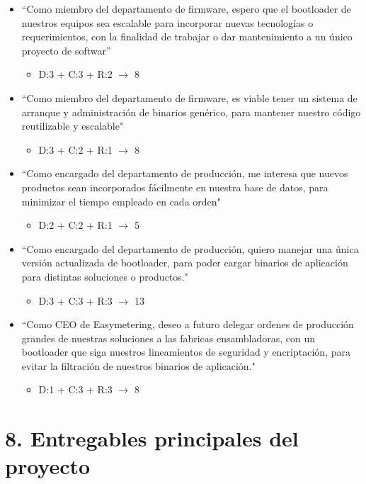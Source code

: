 \documentclass[
11pt, %
]{charter}
\begin{document}
\begin{itemize}
	\item ``Como miembro del departamento de firmware, espero que el bootloader de nuestros equipos sea escalable para incorporar nuevas tecnologías o requerimientos, con la finalidad de trabajar o dar mantenimiento a un único proyecto de softwar''
	\begin{itemize}
		\item D:3 + C:3 + R:2 $\rightarrow$ 8
	\end{itemize}
	\item ``Como miembro del departamento de firmware, es viable tener un sistema de arranque y administración de binarios genérico, para mantener nuestro código reutilizable y escalable"
	\begin{itemize}
		\item D:3 + C:2 + R:1 $\rightarrow$ 8
	\end{itemize}
	\item ``Como encargado del departamento de producción, me interesa que nuevos productos sean incorporados fácilmente en nuestra base de datos, para minimizar el tiempo empleado en cada orden"
	\begin{itemize}
		\item D:2 + C:2 + R:1 $\rightarrow$ 5
	\end{itemize}
	\item ``Como encargado del departamento de producción, quiero manejar una única versión actualizada de bootloader, para poder cargar binarios de aplicación para distintas soluciones o productos."
	\begin{itemize}
		\item D:3 + C:3 + R:3 $\rightarrow$ 13
	\end{itemize}
	\item ``Como CEO de Easymetering, deseo a futuro delegar ordenes de producción grandes de nuestras soluciones a las fabricas ensambladoras, con un bootloader que siga nuestros lineamientos de seguridad y encriptación, para evitar la filtración de nuestros binarios de aplicación."
	\begin{itemize}
		\item D:1 + C:3 + R:3 $\rightarrow$ 8
	\end{itemize}
\end{itemize}

\section{8. Entregables principales del proyecto}
\label{sec:entregables}
\end{document}
